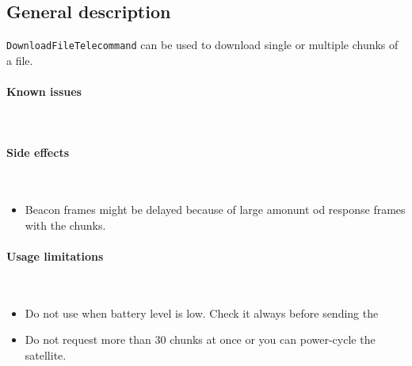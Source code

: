 

\subsection{General description}
\texttt{DownloadFileTelecommand} can be used to download single or multiple chunks of a file.

\paragraph{Known issues} \mbox{} \\
\None

\paragraph{Side effects} \mbox{} \\
\begin{itemize}
    \item Beacon frames might be delayed because of large amonunt od response frames with the chunks. 
\end{itemize}

\paragraph{Usage limitations} \mbox{} \\
\begin{itemize}
    \item Do not use when battery level is low. Check it always before sending the 
    \item Do not request more than 30 chunks at once or you can power-cycle the satellite.
\end{itemize}

